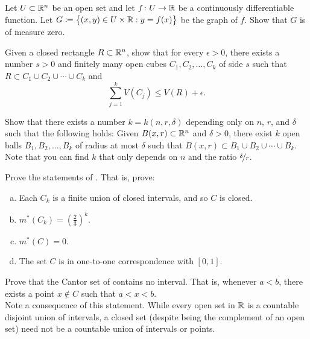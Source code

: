 \begin{exercise}
Let $U \subset {\mathbb{R}}^n$ be an open set
and let $f \colon U \to {\mathbb{R}}$ be a continuously differentiable function.
Let $G \coloneqq \bigl\{ (x,y) \in U \times {\mathbb{R}} : y = f(x) \bigr\}$ be the graph of $f$.
Show that $G$ is of measure zero.
\end{exercise}

\begin{exercise}
Given a closed rectangle $R \subset {\mathbb{R}}^n$, show that for every $\epsilon > 0$,
there exists a number $s > 0$ and finitely many open cubes
$C_1,C_2,\ldots,C_k$ of side $s$ such that
$R \subset C_1 \cup C_2 \cup \cdots \cup C_k$ and
\begin{equation*}
\sum_{j=1}^k V(C_j) \leq V(R) + \epsilon .
\end{equation*}
\end{exercise}

\begin{exercise}
Show that there exists a number $k = k(n,r,\delta)$ depending only on $n$,
$r$, and $\delta$ such that
the following holds:
Given $B(x,r) \subset {\mathbb{R}}^n$ and $\delta > 0$, there exist
$k$ open balls $B_1,B_2,\ldots,B_k$ of radius at most
$\delta$ such that $B(x,r) \subset B_1 \cup B_2 \cup \cdots \cup B_k$.
Note that you can find $k$ that only depends on $n$ and the ratio
$\nicefrac{\delta}{r}$.
\end{exercise}

\begin{exercise}[Challenging]
Prove the statements of .  That is,
prove:
\begin{enumerate}[a)]
\item
Each $C_k$ is a finite union of closed intervals, and so $C$ is closed.
\item
$m^*(C_k) = {\left(\frac{2}{3}\right)}^k$.
\item
$m^*(C) = 0$.
\item
The set $C$ is in one-to-one correspondence with $[0,1]$.
\end{enumerate}
\end{exercise}

\begin{exercise}
\pagebreak[3]
Prove that the Cantor set of  contains no
interval.  That is, whenever $a < b$, there exists a point $x \notin C$
such that $a < x < b$.
\\
Note a consequence of this statement.  While every open set in
${\mathbb{R}}$ is a countable disjoint union of intervals, a closed set (despite
being the complement of an open set) need not be a countable union of
intervals or points.
\end{exercise}

